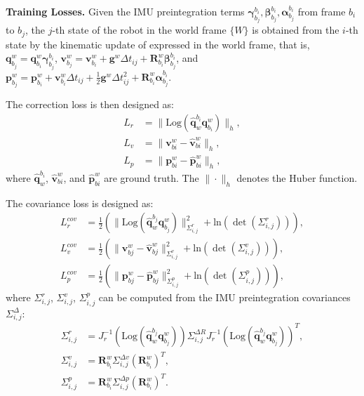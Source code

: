 \noindent\textbf{Training Losses.}
Given the IMU preintegration terms $\bm{\gamma}^{b_i}_{b_j},\bm{\beta}^{b_i}_{b_j},\bm{\alpha}^{b_i}_{b_j}$ from frame $b_i$ to $b_j$, the $j$-th state of the robot in the world frame $\{W\}$ is obtained from the $i$-th state by the kinematic update of  expressed in the world frame, that is, $\mathbf{q}^{w}_{b_j}=\mathbf{q}^{w}_{b_i}\bm{\gamma}_{b_j}^{b_i}$, $\mathbf{v}^{w}_{b_j}=\mathbf{v}^{w}_{b_i}+\mathbf{g}^{w}\Delta t_{ij}+\mathbf{R}^{w}_{b_i}\bm{\beta}_{b_j}^{b_i}$, and $\mathbf{p}^{w}_{b_j}=\mathbf{p}^{w}_{b_i}+\mathbf{v}^{w}_{b_i}\Delta t_{ij}+\tfrac{1}{2}\mathbf{g}^{w}\Delta t_{ij}^{2}+\mathbf{R}^{w}_{b_i}\bm{\alpha}_{b_j}^{b_i}$.

The correction loss is then designed as:
\begin{equation}
\begin{aligned}
L_r &= \| \text{Log}(\hat{\mathbf{q}}_w^{b_i} \mathbf{q}^w_{b_i}) \|_h, \\
L_v  &= \| \mathbf{v}^{w}_{bi}-\hat{\mathbf{v}}^{w}_{bi} \|_h, \\
L_p  &= \| \mathbf{p}^{w}_{bi}-\hat{\mathbf{p}}^{w}_{bi} \|_h,
\end{aligned}
\end{equation}
where $\hat{\mathbf{q}}_w^{b_i}$, $\hat{\mathbf{v}}^{w}_{bi}$, and $\hat{\mathbf{p}}^{w}_{bi}$ are ground truth. The $\|\cdot\|_h$ denotes the Huber function.

The covariance loss is designed as:
\begin{equation}
\begin{aligned}
L_r^{cov} &=\frac{1}{2} (\| \text{Log}(\hat{\mathbf{q}}_w^{b_j} \mathbf{q}^w_{b_j}) \|^2_{\Sigma^r_{i,j}} + \text{ln}(\det(\Sigma^r_{i,j}))),\\
L_v^{cov}  &= \frac{1}{2} (\| \mathbf{v}^{w}_{bj}-\hat{\mathbf{v}}^{w}_{bj} \|^2_{\Sigma^v_{i,j}} + \text{ln}(\det(\Sigma^v_{i,j}))), \\
L_p^{cov}  &= \frac{1}{2} (\| \mathbf{p}^{w}_{bj}-\hat{\mathbf{p}}^{w}_{bj} \|^2_{\Sigma^p_{i,j}} + \text{ln}(\det(\Sigma^p_{i,j}))),
\end{aligned}
\end{equation}
where $\Sigma^r_{i,j}$, $\Sigma^v_{i,j}$, $\Sigma^p_{i,j}$ can be computed from the IMU preintegration covariances $\Sigma^{\Delta}_{i,j}$:
\begin{equation}
\begin{aligned}
\Sigma^r_{i,j} &= J_r^{-1}(\text{Log}(\hat{\mathbf{q}}_w^{b_j} \mathbf{q}^w_{b_j})) \Sigma^{\Delta R}_{i,j} J_r^{-1}(\text{Log}(\hat{\mathbf{q}}_w^{b_j} \mathbf{q}^w_{b_j}))^T, \\
\Sigma^v_{i,j} &= \mathbf{R}^w_{b_i} \Sigma^{\Delta v}_{i,j} (\mathbf{R}^w_{b_i})^T, \\
\Sigma^p_{i,j} &= \mathbf{R}^w_{b_i} \Sigma^{\Delta p}_{i,j} (\mathbf{R}^w_{b_i})^T.
\end{aligned}
\end{equation}


